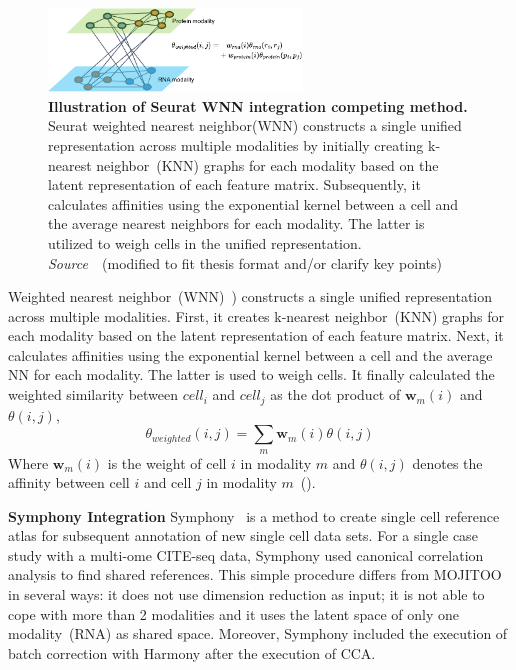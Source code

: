 \begin{description}
\begin{figure}[!h]
  	\centering
  	\includegraphics[width=0.60\textwidth]{Alg_WNN/fig}
  	\vspace{0.1cm}
  	\caption[Illustration of Seurat WNN integration competing method.]{\textbf{Illustration of Seurat WNN integration competing method.} Seurat weighted nearest neighbor(WNN) constructs a single unified representation across multiple modalities by initially creating k-nearest neighbor~(KNN) graphs for each modality based on the latent representation of each feature matrix. Subsequently, it calculates affinities using the exponential kernel between a cell and the average nearest neighbors for each modality. The latter is utilized to weigh cells in the unified representation. \emph{Source~\cite{hao2021seurat4}}~(modified to fit thesis format and/or clarify key points)
  }
  	\label{fig:Alg_WNN}
\end{figure}

  \item[Seurat WNN]
  Weighted nearest neighbor~(WNN)~\citep{hao2021seurat4}) constructs a single unified representation across multiple modalities. First, it creates k-nearest neighbor~(KNN) graphs for each modality based on the latent representation of each feature matrix. Next, it calculates affinities using the exponential kernel between a cell and the average NN for each modality. The latter is used to weigh cells. It finally calculated the weighted similarity between $cell_i$ and $cell_j$ as the dot product of $\textbf{w}_m(i)$ and $\theta(i,j)$,
  \begin{equation}
  	\theta_{weighted}(i,j)=\sum_{m} \textbf{w}_m(i)\theta(i,j)
  \end{equation}
  Where $\textbf{w}_m(i)$ is the weight of cell $i$ in modality $m$ and $\theta(i,j)$ denotes the affinity between cell $i$ and cell $j$ in modality $m$~().


  \item \textbf{Symphony Integration}
  Symphony~\citep{kang2021symphony} is a method to create single cell reference atlas for subsequent annotation of new single cell data sets. For a single case study with a multi-ome CITE-seq data, Symphony used canonical correlation analysis to find shared references. This simple procedure differs from MOJITOO in several ways: it does not use dimension reduction as input; it is not able to cope with more than 2 modalities and it uses the latent space of only one modality~(RNA) as shared space. Moreover, Symphony included the execution of batch correction with Harmony after the execution of CCA.

\end{description}



